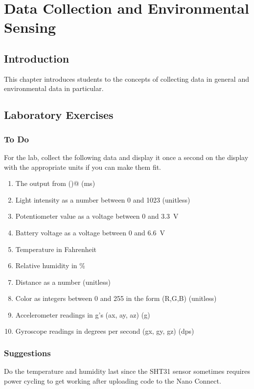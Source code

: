 \chapter{Data Collection and Environmental Sensing}

\section{Introduction}
This chapter introduces students to the concepts of collecting data in general and environmental data in particular.


\section{Laboratory Exercises}
\subsection{To Do}
For the lab, collect the following data and display it once a second on the display with the 
appropriate units if you can make them fit.
\begin{enumerate}
	\item The output from \lstinline@millis()@ (ms)
	\item Light intensity as a number between 0 and 1023 (unitless)
	\item Potentiometer value as a voltage between 0 and 3.3~V
	\item Battery voltage as a voltage between 0 and 6.6~V
	\item Temperature in Fahrenheit
	\item Relative humidity in \%
	\item Distance as a number (unitless)
	\item Color as integers between 0 and 255 in the form (R,G,B) (unitless)
	\item Accelerometer readings in g's (ax, ay, az) (g)
	\item Gyroscope readings in degrees per second (gx, gy, gz) (dps)
\end{enumerate}

\subsection{Suggestions}
Do the temperature and humidity last since the SHT31 sensor sometimes requires power cycling 
to get working after uploading code to the Nano Connect.

